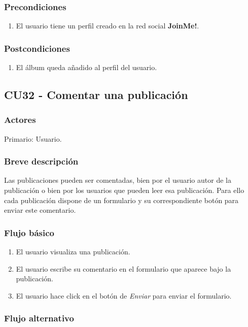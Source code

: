 \documentclass[12pt, a4paper, titlepage]{article}
\begin{document}
\subsubsection{Precondiciones}
\begin{enumerate}
	\item El usuario tiene un perfil creado en la red social \textbf{JoinMe!}.
\end{enumerate}
\subsubsection{Postcondiciones}
\begin{enumerate}
	\item El álbum queda añadido al perfil del usuario.
\end{enumerate}


\subsection{CU32 - Comentar una publicación}
\subsubsection{Actores}
Primario: Usuario.
\subsubsection{Breve descripción}
Las publicaciones pueden ser comentadas, bien por el usuario autor de la publicación o bien por los usuarios que pueden leer esa publicación. Para ello cada publicación dispone de un formulario y su correspondiente botón para enviar este comentario.

\subsubsection{Flujo básico}
\begin{enumerate}
	\item El usuario visualiza una publicación.
	\item El usuario escribe su comentario en el formulario que aparece bajo la publicación.
	\item El usuario hace click en el botón de \textit{Enviar} para enviar el formulario.
\end{enumerate}
\subsubsection{Flujo alternativo}
\end{document}
